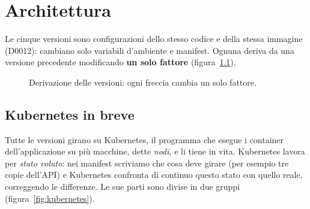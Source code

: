 \chapter{Architettura}
\label{cap:architettura}

Le cinque versioni sono configurazioni dello stesso codice e della stessa immagine (D0012): cambiano solo variabili d'ambiente e manifest. Ognuna deriva da una versione precedente modificando \textbf{un solo fattore} (figura~\ref{fig:derivazione}).

\begin{figure}[htbp]
\centering
{}
\caption{Derivazione delle versioni: ogni freccia cambia un solo fattore.}
\label{fig:derivazione}
\end{figure}

\section{Kubernetes in breve}
\label{s:kubernetes}

Tutte le versioni girano su Kubernetes, il programma che esegue i container dell'applicazione su più macchine, dette \emph{nodi}, e li tiene in vita. Kubernetes lavora per \emph{stato voluto}: nei manifest scriviamo che cosa deve girare (per esempio tre copie dell'API) e Kubernetes confronta di continuo questo stato con quello reale, correggendo le differenze. Le sue parti sono divise in due gruppi (figura~\ref{fig:kubernetes}).


